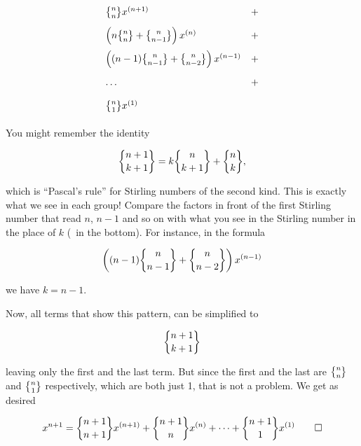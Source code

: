 \documentclass[tikz]{scrreprt}
\begin{document}
\[
\begingroup
\renewcommand{\arraystretch}{2}
\begin{array}{lc}
\stirlingTwo{n}{n}x^{(n+1)} & + \\
\left(n\stirlingTwo{n}{n} + \stirlingTwo{n}{n-1}\right)x^{(n)} & + \\
\left((n-1)\stirlingTwo{n}{n-1} + \stirlingTwo{n}{n-2}\right)x^{(n-1)} & + \\ 
\dots & + \\
\stirlingTwo{n}{1}x^{(1)} &
\end{array}
\endgroup
\]


You might remember the identity

\begin{equation}
\stirlingTwo{n+1}{k+1} = k\stirlingTwo{n}{k+1} + \stirlingTwo{n}{k},
\end{equation}

which is ``Pascal's rule'' for Stirling numbers of the second kind.
This is exactly what we see in each group! Compare the factors
in front of the first Stirling number that read $n$, $n-1$ and so on
with what you see in the Stirling number in the place of $k$ (\ie\ in the bottom).
For instance, in the formula

\[
\left((n-1)\stirlingTwo{n}{n-1} + \stirlingTwo{n}{n-2}\right)x^{(n-1)}
\]

we have $k = n-1$.

Now, all terms that show this pattern,
can be simplified to

\[
\stirlingTwo{n+1}{k+1}
\]

leaving only the first and the last term.
But since the first and the last are $\stirlingTwo{n}{n}$ and
$\stirlingTwo{n}{1}$ respectively, which are both just 1,
that is not a problem. We get as desired

\begin{equation}
x^{n+1} = \stirlingTwo{n+1}{n+1}x^{(n+1)} +
          \stirlingTwo{n+1}{n}x^{(n)} + \dots + 
          \stirlingTwo{n+1}{1}x^{(1)}\qed
\end{equation}
\end{document}
